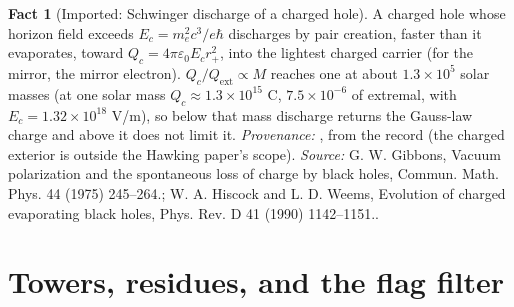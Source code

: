 \documentclass[11pt]{article}
\theoremstyle{definition}
\newtheorem{fact}[theorem]{Fact}
\theoremstyle{plain}
\begin{document}
\begin{fact}[Imported: Schwinger discharge of a charged hole]\label{c:dark-matter.imported-schwinger-discharge-charged-hole}
A charged hole whose horizon field exceeds $E_{c} = m_{e}^{2}c^{3}/e\hbar$ discharges by pair creation, faster than it evaporates, toward $Q_{c} = 4\pi\varepsilon_{0}E_{c}r_{+}^{2}$, into the lightest charged carrier (for the mirror, the mirror electron). $Q_{c}/Q_{\mathrm{ext}} \propto M$ reaches one at about $1.3 \times 10^{5}$ solar masses (at one solar mass $Q_{c} \approx 1.3 \times 10^{15}$ C, $7.5 \times 10^{-6}$ of extremal, with $E_{c} = 1.32 \times 10^{18}$ V/m), so below that mass discharge returns the Gauss-law charge and above it does not limit it. \emph{Provenance:} \cite{Gibbons1975, HiscockWeems1990}, from the record (the charged exterior is outside the Hawking paper's scope).
\emph{Source:} G. W. Gibbons, Vacuum polarization and the spontaneous loss of charge by black holes, Commun. Math. Phys. 44 (1975) 245--264.; W. A. Hiscock and L. D. Weems, Evolution of charged evaporating black holes, Phys. Rev. D 41 (1990) 1142--1151..
\end{fact}

\section{Towers, residues, and the flag filter}
\end{document}
